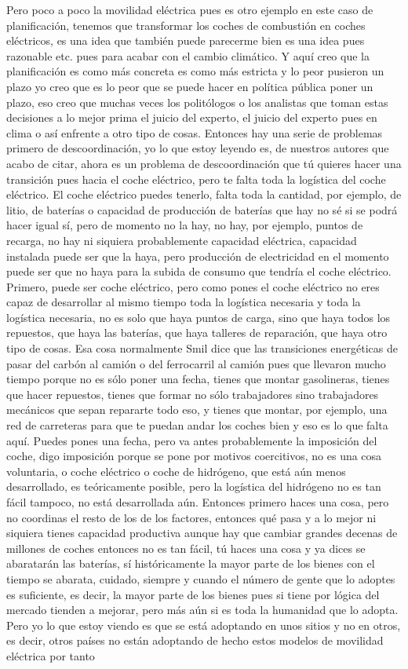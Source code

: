 Pero poco a poco la movilidad eléctrica pues es otro ejemplo en este caso de planificación, tenemos que transformar los coches de combustión en coches eléctricos,  es una idea que también puede parecerme bien es una idea pues razonable etc. pues para acabar con el cambio climático. Y aquí creo que la planificación es como más concreta es como más estricta y lo peor pusieron un plazo yo creo que es lo peor que se puede hacer en política pública poner un plazo, eso creo que muchas veces los politólogos o los analistas que toman estas decisiones a lo mejor prima el juicio del experto, el juicio del experto pues en clima o así enfrente a otro tipo de cosas. Entonces hay una serie de problemas primero de descoordinación, yo lo que estoy leyendo es, de nuestros autores que acabo de citar, ahora es un problema de descoordinación que tú quieres hacer una transición pues hacia el coche eléctrico, pero te falta toda la logística del coche eléctrico. El coche eléctrico puedes tenerlo, falta toda la cantidad, por ejemplo, de litio, de baterías o capacidad de producción de baterías que hay no sé si se podrá hacer igual sí, pero de momento no la hay, no hay, por ejemplo, puntos de recarga, no hay ni siquiera probablemente capacidad eléctrica, capacidad instalada puede ser que la haya, pero producción de electricidad en el momento puede ser que no haya para la subida de consumo que tendría el coche eléctrico. Primero, puede ser coche eléctrico, pero como pones el coche eléctrico no eres capaz de desarrollar al mismo tiempo toda la logística necesaria y toda la logística necesaria, no es solo que haya puntos de carga, sino que haya todos los repuestos, que haya las baterías, que haya talleres de reparación, que haya otro tipo de cosas. Esa cosa normalmente Smil dice que las transiciones energéticas de pasar del carbón al camión o del ferrocarril al camión pues que llevaron mucho tiempo porque no es sólo poner una fecha, tienes que montar gasolineras, tienes que hacer repuestos, tienes que formar no sólo trabajadores sino trabajadores mecánicos que sepan repararte todo eso, y tienes que montar, por ejemplo, una red de carreteras para que te puedan andar los coches bien y eso es lo que falta aquí. Puedes pones una fecha, pero va antes probablemente la imposición del coche, digo imposición porque se pone por motivos coercitivos, no es una cosa voluntaria, o coche eléctrico o coche de hidrógeno, que está aún menos desarrollado, es teóricamente posible, pero la logística del hidrógeno no es tan fácil tampoco, no está desarrollada aún. Entonces primero haces una cosa, pero no coordinas el resto de los de los factores, entonces qué pasa y a lo mejor ni siquiera tienes capacidad productiva aunque hay que cambiar grandes decenas de millones de coches entonces no es tan fácil, tú haces una cosa y ya dices se abaratarán las baterías, sí históricamente la mayor parte de los bienes con el tiempo se abarata, cuidado, siempre y cuando el número de gente que lo adoptes es suficiente, es decir, la mayor parte de los bienes pues si tiene por lógica del mercado tienden a mejorar, pero más aún si es toda la humanidad que lo adopta. Pero yo lo que estoy viendo es que se está adoptando en unos sitios y no en otros, es decir, otros países no están adoptando de hecho estos modelos de movilidad eléctrica por tanto 